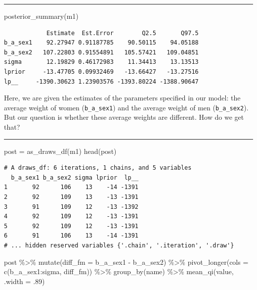 \documentclass[
  letterpaper,
  DIV=11,
  numbers=noendperiod]{scrartcl}
\newenvironment{Shaded}{\begin{snugshade}}{\end{snugshade}}
\newcommand{\AttributeTok}[1]{\textcolor[rgb]{0.40,0.45,0.13}{#1}}
\newcommand{\DecValTok}[1]{\textcolor[rgb]{0.68,0.00,0.00}{#1}}
\newcommand{\FunctionTok}[1]{\textcolor[rgb]{0.28,0.35,0.67}{#1}}
\newcommand{\NormalTok}[1]{\textcolor[rgb]{0.00,0.23,0.31}{#1}}
\newcommand{\OtherTok}[1]{\textcolor[rgb]{0.00,0.23,0.31}{#1}}
\newcommand{\SpecialCharTok}[1]{\textcolor[rgb]{0.37,0.37,0.37}{#1}}
\begin{document}
\begin{center}\rule{0.5\linewidth}{0.5pt}\end{center}

\begin{Shaded}
\begin{Highlighting}[]
\FunctionTok{posterior\_summary}\NormalTok{(m1)}
\end{Highlighting}
\end{Shaded}

\begin{verbatim}
            Estimate  Est.Error        Q2.5       Q97.5
b_a_sex1    92.27947 0.91187785    90.50115    94.05188
b_a_sex2   107.22803 0.91554891   105.57421   109.04851
sigma       12.19829 0.46172983    11.34413    13.13513
lprior     -13.47705 0.09932469   -13.66427   -13.27516
lp__     -1390.30623 1.23903576 -1393.80224 -1388.90647
\end{verbatim}

Here, we are given the estimates of the parameters specified in our
model: the average weight of women (\texttt{b\_a\_sex1}) and the average
weight of men (\texttt{b\_a\_sex2}). But our question is whether these
average weights are different. How do we get that?

\begin{center}\rule{0.5\linewidth}{0.5pt}\end{center}

\begin{Shaded}
\begin{Highlighting}[]
\NormalTok{post }\OtherTok{=} \FunctionTok{as\_draws\_df}\NormalTok{(m1) }
\FunctionTok{head}\NormalTok{(post)}
\end{Highlighting}
\end{Shaded}

\begin{verbatim}
# A draws_df: 6 iterations, 1 chains, and 5 variables
  b_a_sex1 b_a_sex2 sigma lprior  lp__
1       92      106    13    -14 -1391
2       92      109    13    -13 -1391
3       91      109    12    -13 -1392
4       92      109    12    -13 -1391
5       92      109    12    -13 -1391
6       91      106    13    -14 -1391
# ... hidden reserved variables {'.chain', '.iteration', '.draw'}
\end{verbatim}

\begin{Shaded}
\begin{Highlighting}[]
\NormalTok{post }\SpecialCharTok{\%\textgreater{}\%} 
  \FunctionTok{mutate}\NormalTok{(}\AttributeTok{diff\_fm =}\NormalTok{ b\_a\_sex1 }\SpecialCharTok{{-}}\NormalTok{ b\_a\_sex2) }\SpecialCharTok{\%\textgreater{}\%} 
  \FunctionTok{pivot\_longer}\NormalTok{(}\AttributeTok{cols =} \FunctionTok{c}\NormalTok{(b\_a\_sex1}\SpecialCharTok{:}\NormalTok{sigma, diff\_fm)) }\SpecialCharTok{\%\textgreater{}\%} 
  \FunctionTok{group\_by}\NormalTok{(name) }\SpecialCharTok{\%\textgreater{}\%} 
  \FunctionTok{mean\_qi}\NormalTok{(value, }\AttributeTok{.width =}\NormalTok{ .}\DecValTok{89}\NormalTok{)}
\end{Highlighting}
\end{Shaded}
\end{document}
